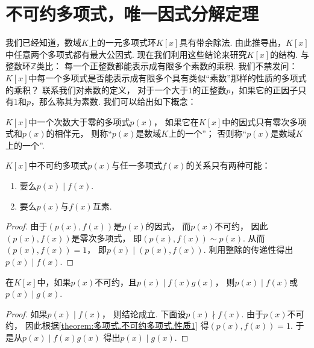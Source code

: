 \section{不可约多项式，唯一因式分解定理}
我们已经知道，数域\(K\)上的一元多项式环\(K[x]\)具有带余除法.
由此推导出，\(K[x]\)中任意两个多项式都有最大公因式.
现在我们利用这些结论来研究\(K[x]\)的结构.
与整数环\(\mathbb{Z}\)类比：
每一个正整数都能表示成有限多个素数的乘积.
我们不禁发问：\(K[x]\)中每一个多项式是否能表示成有限多个具有类似“素数”那样的性质的多项式的乘积？
联系我们对素数的定义，
对于一个大于\(1\)的正整数\(p\)，如果它的正因子只有\(1\)和\(p\)，那么称其为素数.
我们可以给出如下概念：
\begin{definition}
\(K[x]\)中一个次数大于零的多项式\(p(x)\)，
如果它在\(K[x]\)中的因式只有零次多项式和\(p(x)\)的相伴元，
则称“\(p(x)\)是数域\(K\)上的一个”；
否则称“\(p(x)\)是数域\(K\)上的一个”.
\end{definition}

\begin{property}\label{theorem:多项式.不可约多项式.性质1}
\(K[x]\)中不可约多项式\(p(x)\)与任一多项式\(f(x)\)的关系只有两种可能：
\begin{enumerate}
	\item 要么\(p(x) \mid f(x)\).
	\item 要么\(p(x)\)与\(f(x)\)互素.
\end{enumerate}
\begin{proof}
由于\((p(x),f(x))\)是\(p(x)\)的因式，
而\(p(x)\)不可约，
因此\((p(x),f(x))\)是零次多项式，
即\((p(x),f(x)) \sim p(x)\).
从而\((p(x),f(x))=1\)，
即\(p(x) \mid (p(x),f(x))\).
利用整除的传递性得出\(p(x) \mid f(x)\).
\end{proof}
\end{property}

\begin{property}\label{theorem:多项式.不可约多项式.性质2}
在\(K[x]\)中，如果\(p(x)\)不可约，且\(p(x) \mid f(x) g(x)\)，
则\(p(x) \mid f(x)\)或\(p(x) \mid g(x)\).
\begin{proof}
如果\(p(x) \mid f(x)\)，
则结论成立.
下面设\(p(x) \nmid f(x)\).
由于\(p(x)\)不可约，
因此根据\cref{theorem:多项式.不可约多项式.性质1}
得\((p(x),f(x))=1\).
于是从\(p(x) \mid f(x) g(x)\)
得出\(p(x) \mid g(x)\).
\end{proof}
\end{property}

